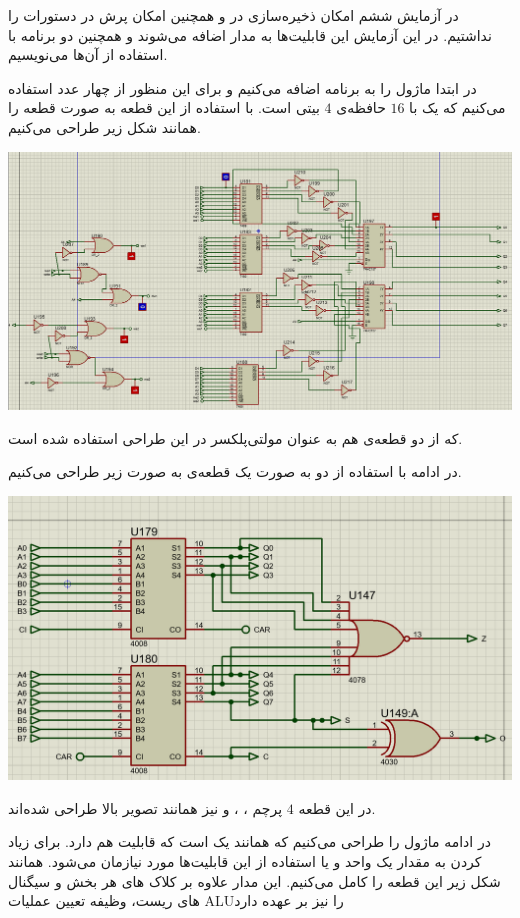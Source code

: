 

در آزمایش ششم امکان ذخیره‌سازی در 
و همچنین
امکان پرش در دستورات را نداشتیم.
در این آزمایش این قابلیت‌ها به مدار اضافه می‌شوند
و همچنین دو برنامه با استفاده  از آن‌ها می‌نویسیم.

در ابتدا ماژول 
را به برنامه اضافه می‌کنیم و برای این منظور از 
چهار عدد 
استفاده می‌کنیم که یک 
با 
$16$
حافظه‌ی
$4$
بیتی است.
با استفاده از 
این قطعه به صورت
قطعه 
را همانند شکل زیر طراحی می‌کنیم.

\includegraphics[width=18cm]{figures/RAM.png}

که از دو قطعه‌ی 
هم به عنوان مولتی‌پلکسر در این طراحی استفاده شده است.

در ادامه با استفاده از دو
به صورت
یک قطعه‌ی
به صورت زیر طراحی می‌کنیم.

\includegraphics[width=18cm]{figures/Adder.png}

در این قطعه
$4$
پرچم
،
،
و
نیز همانند تصویر بالا طراحی شده‌اند.

در ادامه ماژول
را طراحی می‌کنیم که همانند
یک
است که قابلیت 
هم دارد.
برای زیاد کردن 
به مقدار یک واحد و یا
استفاده از
این قابلیت‌ها مورد نیازمان می‌شود.
همانند شکل زیر این قطعه را کامل می‌کنیم.
این مدار علاوه بر کلاک های هر بخش و سیگنال های ریست، وظیفه تعیین عملیات  ALUرا نیز بر عهده دارد


